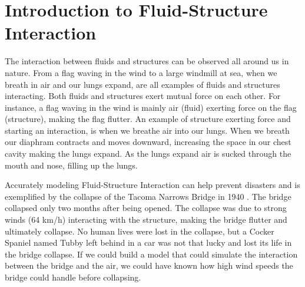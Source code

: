 \chapter{Introduction to Fluid-Structure Interaction}
The interaction between fluids and structures can be observed all around us in nature.
From a flag waving in the wind to a large windmill at sea, when we breath in air and our lungs expand, are all examples of fluids and structures interacting. 
Both fluids and structures exert mutual force on each other. For instance, a flag waving in the wind is mainly air (fluid) exerting force on the flag (structure), making the flag flutter. An example of structure exerting force and starting an interaction, is when we breathe air into our lungs. When we breath our diaphram contracts and moves downward, increasing the space in our chest cavity making the lungs expand. As the lungs expand air is sucked through the mouth and nose, filling up the lungs. 

Accurately modeling Fluid-Structure Interaction can help prevent disasters and is exemplified by the collapse of the Tacoma Narrows Bridge in 1940 \cite{Billah1991}. The bridge collapsed only two months after being opened. The collapse was due to strong winds (64 km/h) interacting with the structure, making the bridge flutter and ultimately collapse. No human lives were lost in the collapse, but a Cocker Spaniel named Tubby left behind in a car was not that lucky and lost its life in the bridge collapse. If we could build a model that could simulate the interaction between the bridge and the air, we could have known how high wind speeds the bridge could handle before collapsing. \newline

